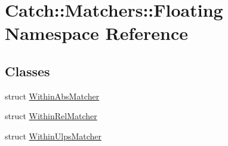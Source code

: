 \hypertarget{namespace_catch_1_1_matchers_1_1_floating}{}\section{Catch\+:\+:Matchers\+:\+:Floating Namespace Reference}
\label{namespace_catch_1_1_matchers_1_1_floating}
\subsection*{Classes}
\begin{DoxyCompactItemize}
\item 
struct \mbox{\hyperlink{struct_catch_1_1_matchers_1_1_floating_1_1_within_abs_matcher}{Within\+Abs\+Matcher}}
\item 
struct \mbox{\hyperlink{struct_catch_1_1_matchers_1_1_floating_1_1_within_rel_matcher}{Within\+Rel\+Matcher}}
\item 
struct \mbox{\hyperlink{struct_catch_1_1_matchers_1_1_floating_1_1_within_ulps_matcher}{Within\+Ulps\+Matcher}}
\end{DoxyCompactItemize}
